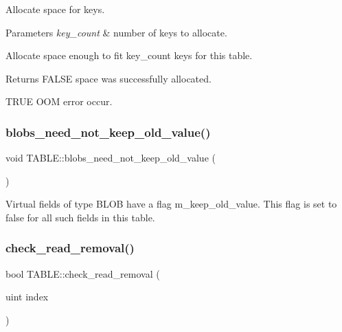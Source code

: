 Allocate space for keys. 


\begin{DoxyParams}{Parameters}
{\em key\+\_\+count} & number of keys to allocate.\\
\hline
\end{DoxyParams}
Allocate space enough to fit \textquotesingle{}key\+\_\+count\textquotesingle{} keys for this table.

\begin{DoxyReturn}{Returns}
F\+A\+L\+SE space was successfully allocated. 

T\+R\+UE O\+OM error occur. 
\end{DoxyReturn}
\mbox{\label{structTABLE_a347de73c59a7bd37a8348f0c55b7037e}} 
\subsubsection{\texorpdfstring{blobs\+\_\+need\+\_\+not\+\_\+keep\+\_\+old\+\_\+value()}{blobs\_need\_not\_keep\_old\_value()}}
{\footnotesize\ttfamily void T\+A\+B\+L\+E\+::blobs\+\_\+need\+\_\+not\+\_\+keep\+\_\+old\+\_\+value (\begin{DoxyParamCaption}{ }\end{DoxyParamCaption})}

Virtual fields of type B\+L\+OB have a flag m\+\_\+keep\+\_\+old\+\_\+value. This flag is set to false for all such fields in this table. \mbox{\label{structTABLE_ab03bd2dcb8c01194f4d28d2948aa5ba7}} 
\subsubsection{\texorpdfstring{check\+\_\+read\+\_\+removal()}{check\_read\_removal()}}
{\footnotesize\ttfamily bool T\+A\+B\+L\+E\+::check\+\_\+read\+\_\+removal (\begin{DoxyParamCaption}\item[{uint}]{index }\end{DoxyParamCaption})}

